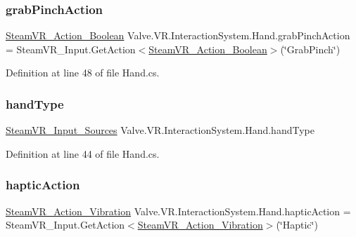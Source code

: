 \subsubsection{\texorpdfstring{grabPinchAction}{grabPinchAction}}
{\footnotesize\ttfamily \mbox{\hyperlink{class_valve_1_1_v_r_1_1_steam_v_r___action___boolean}{Steam\+V\+R\+\_\+\+Action\+\_\+\+Boolean}} Valve.\+V\+R.\+Interaction\+System.\+Hand.\+grab\+Pinch\+Action = Steam\+V\+R\+\_\+\+Input.\+Get\+Action$<$\mbox{\hyperlink{class_valve_1_1_v_r_1_1_steam_v_r___action___boolean}{Steam\+V\+R\+\_\+\+Action\+\_\+\+Boolean}}$>$(\char`\"{}Grab\+Pinch\char`\"{})}



Definition at line 48 of file Hand.\+cs.

\mbox{\label{class_valve_1_1_v_r_1_1_interaction_system_1_1_hand_a05520135148fd74ca10b8549d5c7354d}} 
\subsubsection{\texorpdfstring{handType}{handType}}
{\footnotesize\ttfamily \mbox{\hyperlink{namespace_valve_1_1_v_r_a82e5bf501cc3aa155444ee3f0662853f}{Steam\+V\+R\+\_\+\+Input\+\_\+\+Sources}} Valve.\+V\+R.\+Interaction\+System.\+Hand.\+hand\+Type}



Definition at line 44 of file Hand.\+cs.

\mbox{\label{class_valve_1_1_v_r_1_1_interaction_system_1_1_hand_aa595f318a8edefcde45c293260a913a8}} 
\subsubsection{\texorpdfstring{hapticAction}{hapticAction}}
{\footnotesize\ttfamily \mbox{\hyperlink{class_valve_1_1_v_r_1_1_steam_v_r___action___vibration}{Steam\+V\+R\+\_\+\+Action\+\_\+\+Vibration}} Valve.\+V\+R.\+Interaction\+System.\+Hand.\+haptic\+Action = Steam\+V\+R\+\_\+\+Input.\+Get\+Action$<$\mbox{\hyperlink{class_valve_1_1_v_r_1_1_steam_v_r___action___vibration}{Steam\+V\+R\+\_\+\+Action\+\_\+\+Vibration}}$>$(\char`\"{}Haptic\char`\"{})}



